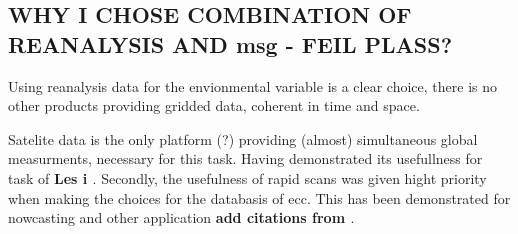 \clearpage
\subsection{WHY I CHOSE COMBINATION OF REANALYSIS AND msg - FEIL PLASS?}
Using reanalysis data for the envionmental variable is a clear choice, there is no other products providing gridded data, coherent in time and space. 

Satelite data is the only platform (?) providing (almost) simultaneous global measurments, necessary for this task. 
Having demonstrated its usefullness for task of \textbf{Les i \cite{Stockli2019CloudApplications}}.
Secondly, the usefulness of rapid scans was given hight priority when making the choices for the databasis of \acrshort{ecc}. This has been demonstrated for nowcasting and other application \textbf{add citations from \cite{Stockli2019CloudApplications}}.
